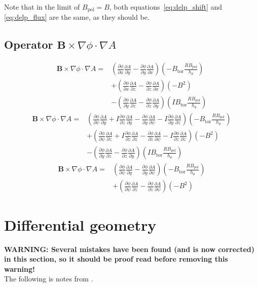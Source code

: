 \documentclass[12pt]{article}
\def\L{\left}
\def\R{\right}
\newcommand{\deriv}[2]{\ensuremath{\frac{\partial #1}{\partial #2}}}
\newcommand{\hthe}{\ensuremath{h_\theta}}
\newcommand{\Bp}{\ensuremath{B_{\text{pol}}}}
\newcommand{\Bt}{\ensuremath{B_{\text{tor}}}}
\newcommand{\ve}[1]{\ensuremath{\boldsymbol{#1}}}
\newcommand{\Bvec}{\ve{B}}
\newcommand{\rbp}{\ensuremath{R\Bp}}
\begin{document}
Note that in the limit of $\Bp = B$, both equations~\ref{eq:delp_shift} and
\ref{eq:delp_flux} are the same, as they should be.



\subsection{Operator \texorpdfstring{$\Bvec\times\nabla\phi\cdot\nabla A$}
%
{B x Nabla Phi Dot Nabla A}}
%
\begin{align*}
\Bvec\times\nabla\phi\cdot\nabla A =& \L(\deriv{\phi}{x}\deriv{A}{y} -
    \deriv{\phi}{y}\deriv{A}{x}\R)\L(-\Bt\frac{\rbp}{\hthe}\R) \\ &+
    \L(\deriv{\phi}{x}\deriv{A}{z} - \deriv{\phi}{z}\deriv{A}{x}\R)\L(-B^2\R)
    \\ &- \L(\deriv{\phi}{y}\deriv{A}{z} -
    \deriv{\phi}{z}\deriv{A}{y}\R)\L(I\Bt\frac{\rbp}{\hthe}\R)
\end{align*}
%
\begin{align*}
\Bvec\times\nabla\phi\cdot\nabla A =& \L(\deriv{\phi}{\psi}\deriv{A}{y} + I
    \deriv{\phi}{z}\deriv{A}{y} - \deriv{\phi}{y}\deriv{A}{\psi} -
    I\deriv{\phi}{y}\deriv{A}{z}\R)\L(-\Bt\frac{\rbp}{\hthe}\R) \\ &+
    \L(\deriv{\phi}{\psi}\deriv{A}{z} + I\deriv{\phi}{z}\deriv{A}{z} -
    \deriv{\phi}{z}\deriv{A}{\psi} - I\deriv{\phi}{z}\deriv{A}{z}\R)\L(-B^2\R)
    \\ &- \L(\deriv{\phi}{y}\deriv{A}{z} -
    \deriv{\phi}{z}\deriv{A}{y}\R)\L(I\Bt\frac{\rbp}{\hthe}\R)
\end{align*}
%
\begin{align*}
\Bvec\times\nabla\phi\cdot\nabla A =& \L(\deriv{\phi}{\psi}\deriv{A}{y} -
    \deriv{\phi}{y}\deriv{A}{\psi}\R)\L(-\Bt\frac{\rbp}{\hthe}\R) \nonumber \\
    &+ \L(\deriv{\phi}{\psi}\deriv{A}{z} - \deriv{\phi}{z}\deriv{A}{\psi}
    \R)\L(-B^2\R)
\end{align*}
%
 

\appendix





\section{Differential geometry}
%
{\color{red} \textbf{WARNING: Several mistakes have been found (and is now
corrected) in this section, so it should be proof read before removing this
warning!}}\\
%
The following is notes from \cite{haeseler-1}.
\end{document}
